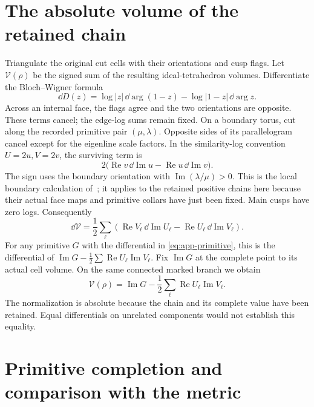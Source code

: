\section{The absolute volume of the retained chain}

Triangulate the original cut cells with their orientations and cusp
flags. Let \(\mathcal V(\rho)\) be the signed sum of the resulting
ideal-tetrahedron volumes. Differentiate the Bloch--Wigner formula
\[
 \dd D(z)=\log|z|\,\dd\arg(1-z)
                       -\log|1-z|\,\dd\arg z.
\]
Across an internal face, the flags agree and the two orientations are
opposite. These terms cancel; the edge-log sums remain fixed.
On a boundary torus, cut along the recorded primitive pair
\((\mu,\lambda)\). Opposite sides of its parallelogram cancel except
for the eigenline scale factors. In the similarity-log convention
\(U=2u,V=2v\), the surviving term is
\[
 2\bigl(\operatorname{Re}v\,\dd\operatorname{Im}u
                  -\operatorname{Re}u\,\dd\operatorname{Im}v\bigr).
\]
The sign uses the boundary orientation with
\(\operatorname{Im}(\lambda/\mu)>0\). This is the local boundary
calculation of~\cite[equation~(7.3)]{MarkedFillings}; it applies to
the retained positive chains here because their actual face maps and
primitive collars have just been fixed. Main cusps have zero logs.
Consequently
\[
 \dd\mathcal V
  =\frac12\sum_\ell\left(
       \operatorname{Re}V_\ell\,\dd\operatorname{Im}U_\ell
       -\operatorname{Re}U_\ell\,\dd\operatorname{Im}V_\ell\right).
\]
For any primitive \(G\) with the differential in
\eqref{eq:app-primitive}, this is the differential of
\(\operatorname{Im}G-\tfrac12\sum\operatorname{Re}U_\ell
                                      \operatorname{Im}V_\ell\).
Fix \(\operatorname{Im}G\) at the complete point to its actual cell
volume. On the same connected marked branch we obtain
\begin{equation}\label{eq:app-absolute-regulator}
 \mathcal V(\rho)=\operatorname{Im}G
       -\frac12\sum_\ell
                     \operatorname{Re}U_\ell\operatorname{Im}V_\ell.
\end{equation}
The normalization is absolute because the chain and its complete value
have been retained. Equal differentials on unrelated components would
not establish this equality.

\section{Primitive completion and comparison with the metric}

